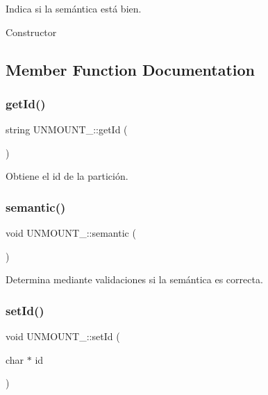 Indica si la semántica está bien. 

Constructor 

\subsection{Member Function Documentation}
\mbox{\label{classUNMOUNT___a5e5019d6ab84211500faf26b95de37c0}} 
\subsubsection{\texorpdfstring{get\+Id()}{getId()}}
{\footnotesize\ttfamily string U\+N\+M\+O\+U\+N\+T\+\_\+\+::get\+Id (\begin{DoxyParamCaption}{ }\end{DoxyParamCaption})}

Obtiene el id de la partición. \mbox{\label{classUNMOUNT___a3fbcb5cc9a934c58f8feaebad15ad4db}} 
\subsubsection{\texorpdfstring{semantic()}{semantic()}}
{\footnotesize\ttfamily void U\+N\+M\+O\+U\+N\+T\+\_\+\+::semantic (\begin{DoxyParamCaption}{ }\end{DoxyParamCaption})}

Determina mediante validaciones si la semántica es correcta. \mbox{\label{classUNMOUNT___a0cd96a661b50f63f616b717147194938}} 
\subsubsection{\texorpdfstring{set\+Id()}{setId()}}
{\footnotesize\ttfamily void U\+N\+M\+O\+U\+N\+T\+\_\+\+::set\+Id (\begin{DoxyParamCaption}\item[{char $\ast$}]{id }\end{DoxyParamCaption})}

